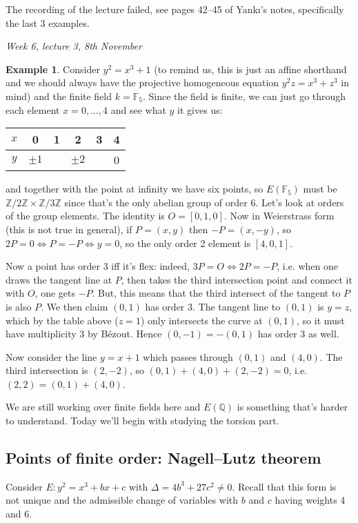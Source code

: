 \documentclass{article}
\newcommand{\F}{\mathbb{F}}
\newcommand{\Z}{\mathbb{Z}}
\newcommand{\Q}{\mathbb{Q}}
\theoremstyle{definition}
\newtheorem{example}[defn]{Example}
\begin{document}
The recording of the lecture failed, see pages 42--45 of Yankı's notes, specifically the last 3 examples.

\begin{flushright}
\textit{Week 6, lecture 3, 8th November}
\end{flushright}

\begin{example}
Consider $y^2=x^3+1$ (to remind us, this is just an affine shorthand and we should always have the projective homogeneous equation $y^2z=x^3+z^3$ in mind) and the finite field $k=\F_5$. Since the field is finite, we can just go through each element $x=0,\ldots,4$ and see what $y$ it gives us:

\begin{table}[h]
\centering
\begin{tabular}{c|ccccc}
$x$ & 0       & 1 & 2       & 3 & 4 \\ \hline
$y$ & $\pm 1$ &   & $\pm 2$ &   & 0
\end{tabular}
\end{table}

and together with the point at infinity we have six points, so $E(\F_5)$ must be $\Z/2\Z\times\Z/3\Z$ since that's the only abelian group of order 6. Let's look at orders of the group elements. The identity is $O=[0,1,0]$. Now in Weierstrass form (this is not true in general), if $P=(x,y)$ then $-P=(x,-y)$, so $2P=0\iff P=-P\iff y=0$, so the only order 2 element is $[4,0,1]$.

Now a point has order 3 iff it's flex: indeed, $3P=O\iff 2P=-P$, i.e. when one draws the tangent line at $P$, then takes the third intersection point and
connect it with $O$, one gets $-P$. But, this means that the third intersect of the tangent to $P$ is
also $P$. We then claim $(0,1)$ has order 3. The tangent line to $(0,1)$ is $y=z$, which by the table above ($z=1$) only intersects the curve at $(0,1)$, so it must have multiplicity 3 by Bézout. Hence $(0,-1)=-(0,1)$ has order 3 as well.

Now consider the line $y=x+1$ which passes through $(0,1)$ and $(4,0)$. The third intersection is $(2,-2)$, so $(0,1)+(4,0)+(2,-2)=0$, i.e. $(2,2)=(0,1)+(4,0)$.

We are still working over finite fields here and $E(\Q)$ is something that's harder to understand. Today we'll begin with studying the torsion part.
\end{example}

\subsection{Points of finite order: Nagell--Lutz theorem}
Consider $E:y^2=x^3+bx+c$ with $\Delta=4b^3+27c^2\neq 0$. Recall that this form is not unique and the admissible change of variables with $b$ and $c$ having weights 4 and 6.
\end{document}
